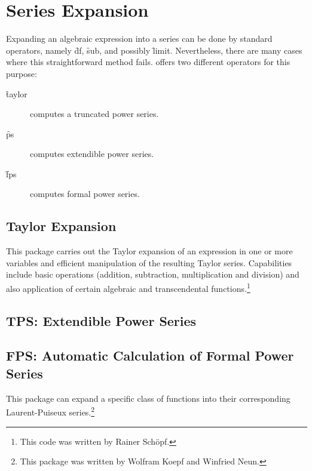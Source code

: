 \chapter{Series Expansion}

Expanding an algebraic expression into a series can be done by standard \REDUCE operators, namely \f{df}, \f{sub}, and possibly \f{limit}.
Nevertheless, there are many cases where this straightforward method fails.
\REDUCE offers two different operators for this purpose:
\begin{description}
\item[\f{taylor}] computes a truncated power series.
\item[\f{ps}] computes extendible power series.
  \item[\f{fps}] computes formal power series.
\end{description}

\section{Taylor Expansion}
This package carries out the Taylor expansion of an expression in one
or more variables and efficient manipulation of the resulting Taylor
series. Capabilities include basic operations (addition, subtraction,
multiplication and division) and also application of certain algebraic
and transcendental functions.\footnote{This code was written by Rainer Schöpf.}



\section{TPS: Extendible Power Series}


\newpage

\section{FPS: Automatic Calculation of Formal Power Series}

This package can expand a specific class of functions into their
corresponding Laurent-Puiseux series.\footnote{This package was written by Wolfram Koepf and Winfried Neun.}


